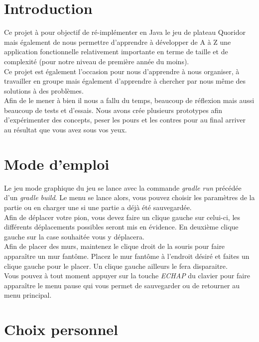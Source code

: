\documentclass[a4paper, 12pt]{article}
\begin{document}
\tableofcontents

\newpage

\section{Introduction}

Ce projet à pour objectif de ré-implémenter en Java le jeu de plateau Quoridor mais également de nous permettre d'apprendre à développer de A à Z une application fonctionnelle relativement importante en terme de taille et de complexité (pour notre niveau de première année du moins). \\
Ce projet est également l'occasion pour nous d'apprendre à nous organiser, à travailler en groupe mais également d'apprendre à chercher par nous même des solutions à des problèmes. \\
Afin de le mener à bien il nous a fallu du temps, beaucoup de réflexion mais aussi beaucoup de tests et d'essais. Nous avons crée plusieurs prototypes afin d'expérimenter des concepts, peser les pours et les contres pour au final arriver au résultat que vous avez sous vos yeux.

\section{Mode d'emploi}

Le jeu mode graphique du jeu se lance avec la commande \textit{gradle run} précédée d'un
\textit{gradle build}. Le menu se lance alors, vous pouvez choisir les paramètres de la
partie ou en charger une si une partie a déjà été sauvegardée. \\
Afin de déplacer votre pion, vous devez faire un clique gauche sur celui-ci, les différents déplacements possibles seront mis en évidence. En deuxième clique gauche sur la case souhaitée vous y déplacera. \\
Afin de placer des murs, maintenez le clique droit de la souris pour faire apparaître un mur fantôme. Placez le mur fantôme à l'endroit désiré et faites un clique gauche pour le placer. Un clique gauche ailleurs le fera disparaitre. \\
Vous pouvez à tout moment appuyer sur la touche \textit{ECHAP} du clavier pour faire apparaître le menu pause qui vous permet de sauvegarder ou de retourner au menu principal.

\section{Choix personnel}
\end{document}
